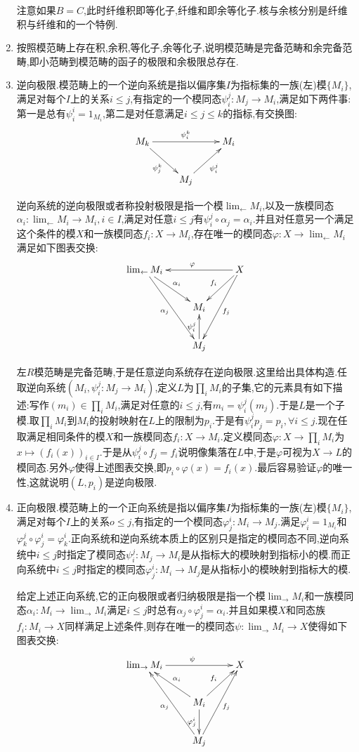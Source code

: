 \begin{enumerate}
    注意如果$B=C$,此时纤维积即等化子,纤维和即余等化子.核与余核分别是纤维积与纤维和的一个特例.
    \item 按照模范畴上存在积,余积,等化子,余等化子,说明模范畴是完备范畴和余完备范畴,即小范畴到模范畴的函子的极限和余极限总存在.
	\item 逆向极限.模范畴上的一个逆向系统是指以偏序集$I$为指标集的一族(左)模$\{M_i\}$,满足对每个$I$上的关系$i\le j$,有指定的一个模同态$\psi_i^j:M_j\to M_i$,满足如下两件事:第一是总有$\psi_i^i=1_{M_i}$,第二是对任意满足$i\le j\le k$的指标,有交换图:
	$$\xymatrix{M_k\ar[dr]_{\psi_j^k}\ar[rr]^{\psi_i^k}&&M_i\\&M_j\ar[ur]_{\psi_i^j}&}$$
	
	逆向系统的逆向极限或者称投射极限是指一个模$\lim_{\leftarrow}M_i$,以及一族模同态$\alpha_i:\lim_{\leftarrow}M_i\to M_i,i\in I$,满足对任意$i\le j$有$\psi_i^j\circ\alpha_j=\alpha_i$.并且对任意另一个满足这个条件的模$X$和一族模同态$f_i:X\to M_i$,存在唯一的模同态$\varphi:X\to\lim_{\leftarrow}M_i$满足如下图表交换:
	$$\xymatrix{\lim_{\leftarrow}M_i\ar[dr]^{\alpha_i}\ar[ddr]_{\alpha_j}&&X\ar[ll]_{\varphi}\ar[dl]_{f_i}\ar[ddl]^{f_j}\\&M_i&\\&M_j\ar[u]^{\psi_i^j}&}$$
	
	左$R$模范畴是完备范畴,于是任意逆向系统存在逆向极限.这里给出具体构造.任取逆向系统$(M_i,\psi_i^j:M_j\to M_i)$,定义$L$为$\prod_i M_i$的子集,它的元素具有如下描述:写作$(m_i)\in\prod_iM_i$,满足对任意的$i\le j$,有$m_i=\psi_i^j(m_j)$.于是$L$是一个子模.取$\prod_iM_i$到$M_i$的投射映射在$L$上的限制为$p_i$.于是有$\psi_i^jp_j=p_i,\forall i\le j$.现在任取满足相同条件的模$X$和一族模同态$f_i:X\to M_i$.定义模同态$\varphi:X\to\prod_iM_i$为$x\mapsto(f_i(x))_{i\in I}$.于是从$\psi_i^j\circ f_j=f_i$说明像集落在$L$中,于是$\varphi$可视为$X\to L$的模同态.另外$\varphi$使得上述图表交换,即$p_i\circ\varphi(x)=f_i(x)$.最后容易验证$\varphi$的唯一性,这就说明$(L,p_i)$是逆向极限.
	
	\item 正向极限.模范畴上的一个正向系统是指以偏序集$I$为指标集的一族(左)模$\{M_i\}$,满足对每个$I$上的关系$o\le j$,有指定的一个模同态$\varphi_j^i:M_i\to M_j$.满足$\varphi_i^i=1_{M_i}$和$\varphi_k^j\circ\varphi_j^i=\varphi_k^i$.正向系统和逆向系统本质上的区别只是指定的模同态不同,逆向系统中$i\le j$时指定了模同态$\psi_i^j:M_j\to M_i$是从指标大的模映射到指标小的模.而正向系统中$i\le j$时指定的模同态$\varphi_j^i:M_i\to M_j$是从指标小的模映射到指标大的模.
	
	给定上述正向系统,它的正向极限或者归纳极限是指一个模$\lim_{\rightarrow}M_i$和一族模同态$\alpha_i:M_i\to\lim_{\rightarrow}M_i$满足$i\le j$时总有$\alpha_j\circ\varphi_j^i=\alpha_i$.并且如果模$X$和同态族$f_i:M_i\to X$同样满足上述条件,则存在唯一的模同态$\psi:\lim_{\rightarrow}M_i\to X$使得如下图表交换:
	$$\xymatrix{\lim_{\rightarrow}M_i\ar[rr]^{\psi}&&X\\&M_i\ar[ul]_{\alpha_i}\ar[ur]^{f_i}\ar[d]_{\varphi_j^i}&\\&M_j\ar[uul]^{\alpha_j}\ar[uur]_{f_j}&}$$
	

\end{enumerate}

